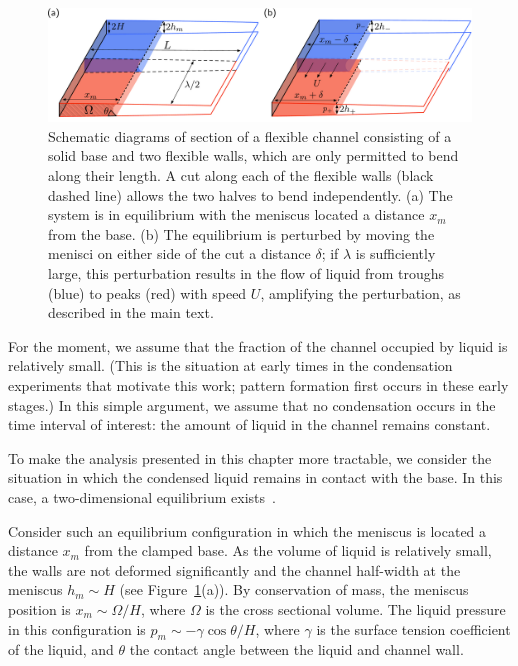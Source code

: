 \begin{figure}[t]
\centering
\includegraphics[width = \textwidth]{Scaling_3d}
\caption{Schematic diagrams of section of a flexible channel consisting of a solid base and two flexible walls, which are only permitted to bend along their length. A cut along each of the flexible walls (black dashed line) allows the two halves to bend independently. (a) The system is in equilibrium with the meniscus located a distance $x_m$ from the base.  (b) The equilibrium is perturbed by moving the menisci on either side of the cut a distance $\delta$; if $\lambda$ is sufficiently large, this perturbation results in the flow of liquid from troughs (blue) to peaks (red) with speed $U$, amplifying the perturbation, as described in the main text.}
\label{fig:InstabilityChapter:SlowCondensation:Scaling:ToyProblem}
\end{figure}

For the moment, we assume that the fraction of the channel occupied by liquid is relatively small. (This is the situation at early times in the condensation experiments that motivate this work; pattern formation first occurs in these early stages.) In this simple argument, we assume that no condensation occurs in the time interval of interest: the amount of liquid in the channel remains constant.

To make the analysis presented in this chapter more tractable, we consider the situation in which the condensed liquid remains in contact with the base. In this case, a two-dimensional equilibrium exists~\citep{Taroni2012JFM}.

Consider such an equilibrium configuration in which the meniscus is located a distance $x_m$ from the clamped base. As the volume of liquid is relatively small, the walls are not deformed significantly and the channel half-width at the meniscus $h_m \sim H$ (see Figure~\ref{fig:InstabilityChapter:SlowCondensation:Scaling:ToyProblem}(a)). By conservation of mass, the meniscus position is $x_m \sim \Omega / H$, where $\Omega$ is the cross sectional volume. The liquid pressure in this configuration is $p_m \sim -\gamma \cos \theta/H$, where $\gamma$ is the surface tension coefficient of the liquid, and $\theta$ the contact angle between the liquid and channel wall.

